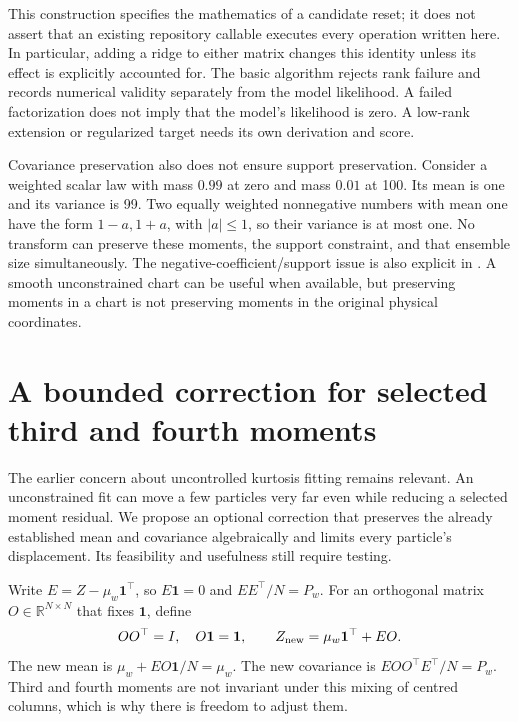\documentclass[11pt,a4paper]{article}
\newcommand{\R}{\mathbb R}
\newcommand{\one}{\mathbf 1}
\begin{document}
This construction specifies the mathematics of a candidate reset; it does
not assert that an existing repository callable executes every operation
written here. In particular, adding a ridge to either matrix changes this
identity unless its effect is explicitly accounted for. The basic algorithm
rejects rank failure and records numerical validity separately from the
model likelihood. A failed factorization does not imply that the model's
likelihood is zero. A low-rank extension or regularized target needs its own
derivation and score.

Covariance preservation also does not ensure support preservation.
Consider a weighted scalar law with mass \(0.99\) at zero and mass \(0.01\)
at 100. Its mean is one and its variance is 99. Two equally weighted
nonnegative numbers with mean one have the form \(1-a,1+a\), with
\(|a|\leq1\), so their variance is at most one. No transform can preserve
these moments, the support constraint, and that ensemble size simultaneously.
The negative-coefficient/support issue is also explicit in
\citet[Section 7.3]{acevedo2017}. A smooth unconstrained chart can be useful
when available, but preserving moments in a chart is not preserving moments
in the original physical coordinates.

\section{A bounded correction for selected third and fourth moments}

The earlier concern about uncontrolled kurtosis fitting remains relevant.
An unconstrained fit can move a few particles very far even while reducing
a selected moment residual. We propose an optional correction that preserves
the already established mean and covariance algebraically and limits every
particle's displacement. Its feasibility and usefulness still require testing.

Write \(E=Z-\mu_w\one^\top\), so \(E\one=0\) and \(EE^\top/N=P_w\).
For an orthogonal matrix \(O\in\R^{N\times N}\) that fixes \(\one\), define
\begin{equation}
\label{eq:orthogonal-repair}
 OO^\top=I,\quad O\one=\one,\qquad
 Z_{\rm new}=\mu_w\one^\top+EO.
\end{equation}
The new mean is \(\mu_w+EO\one/N=\mu_w\).
The new covariance is \(EOO^\top E^\top/N=P_w\).
Third and fourth moments are not invariant under this mixing of centred
columns, which is why there is freedom to adjust them.
\end{document}
